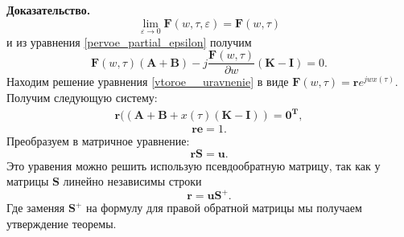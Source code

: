 \textbf{Доказательство.}  
\[\lim_{\varepsilon\to 0} \boldsymbol{F}(w,\tau,\varepsilon)=\boldsymbol{F}(w,\tau)\]
и из уравнения \eqref{pervoe_partial_epsilon} получим
\[\boldsymbol{F}(w,\tau)(\boldsymbol{A} + \boldsymbol{B})
-j\frac{\boldsymbol{F}(w,\tau)}{\partial w}(\boldsymbol{K}-\boldsymbol{I})=0.\]
Находим решение уравнения \eqref{vtoroe__uravnenie} в виде $\boldsymbol{F}(w,\tau)=\boldsymbol{r}e^{jwx(\tau)}$. 
Получим следующую систему:\\
\begin{align}\label{r}
	\boldsymbol{r}((\boldsymbol{A} + \boldsymbol{B} +x(\tau)(\boldsymbol{K}-\boldsymbol{I}))=\boldsymbol{0^T},
\end{align}
\[\boldsymbol{r}\boldsymbol{e}= 1.\]
Преобразуем в матричное уравнение:
\[\boldsymbol{r}\boldsymbol{S} = \boldsymbol{u}.\]	
Это уравения можно решить использую псевдообратную матрицу, так как у матрицы $\boldsymbol{S}$ линейно независимы строки
\[\boldsymbol{r} = \boldsymbol{u}\boldsymbol{S}^+.\]
Где заменяя \(\boldsymbol{S}^+\) на формулу для правой обратной матрицы мы получаем утверждение теоремы.









